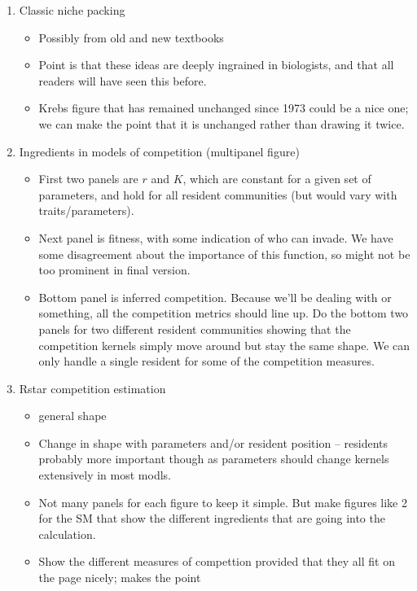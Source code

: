 \documentclass[a4paper,11pt]{article}
\begin{document}
\begin{enumerate}
\item Classic niche packing
  \begin{itemize}
  \item Possibly from old and new textbooks
  \item Point is that these ideas are deeply ingrained in biologists,
    and that all readers will have seen this before.
  \item Krebs figure that has remained unchanged since 1973 could be a
    nice one; we can make the point that it is unchanged rather than
    drawing it twice.
  \end{itemize}
\item Ingredients in models of competition (multipanel figure)
  \begin{itemize}
  \item First two panels are $r$ and $K$, which are constant for a
    given set of parameters, and hold for all resident communities
    (but would vary with traits/parameters).
  \item Next panel is fitness, with some indication of who can
    invade.  We have some disagreement about the importance of this
    function, so might not be too prominent in final version.
  \item Bottom panel is inferred competition.  Because we'll be
    dealing with \citet{Dieckmann-1999} or something, all the
    competition metrics should line up.  Do the bottom two panels for
    two different resident communities showing that the competition
    kernels simply move around but stay the same shape.  We can only
    handle a single resident for some of the competition measures.
  \end{itemize}
\item Rstar competition estimation
  \begin{itemize}
  \item general shape
  \item Change in shape with parameters and/or resident position --
    residents probably more important though as parameters should
    change kernels extensively in most modls.
  \item Not many panels for each figure to keep it simple.  But make
    figures like 2 for the SM that show the different ingredients that
    are going into the calculation.
  \item Show the different measures of compettion provided that they
    all fit on the page nicely; \citet{Abrams-2008} makes the point

\end{itemize}
\end{enumerate}
\end{document}
